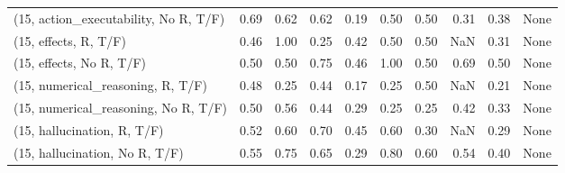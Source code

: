 \begin{table*}[h!]
\begin{adjustbox}{width=2\columnwidth,center}
\begin{tabular}{lrrr|rrr|rrr}
(15, action\_executability, No R, T/F) &                      0.69 &                  0.62 &                      0.62 &                          0.19 &                      0.50 &                          0.50 &                                   0.31 &                               0.38 &                                  None \\
(15, effects, R, T/F)                 &                      0.46 &                  1.00 &                      0.25 &                          0.42 &                      0.50 &                          0.50 &                                    NaN &                               0.31 &                                  None \\
(15, effects, No R, T/F)              &                      0.50 &                  0.50 &                      0.75 &                          0.46 &                      1.00 &                          0.50 &                                   0.69 &                               0.50 &                                  None \\
(15, numerical\_reasoning, R, T/F)     &                      0.48 &                  0.25 &                      0.44 &                          0.17 &                      0.25 &                          0.50 &                                    NaN &                               0.21 &                                  None \\
(15, numerical\_reasoning, No R, T/F)  &                      0.50 &                  0.56 &                      0.44 &                          0.29 &                      0.25 &                          0.25 &                                   0.42 &                               0.33 &                                  None \\
(15, hallucination, R, T/F)           &                      0.52 &                  0.60 &                      0.70 &                          0.45 &                      0.60 &                          0.30 &                                    NaN &                               0.29 &                                  None \\
(15, hallucination, No R, T/F)        &                      0.55 &                  0.75 &                      0.65 &                          0.29 &                      0.80 &                          0.60 &                                   0.54 &                               0.40 &                                  None \\

\end{tabular}
\end{adjustbox}
\end{table*}
